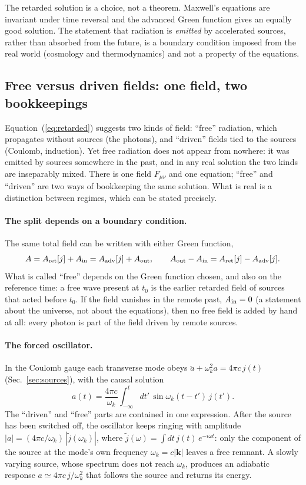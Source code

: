 \documentclass[11pt,a4paper]{book}
\begin{document}
The retarded solution is a choice, not a theorem. Maxwell's equations are invariant under time
reversal and the advanced Green function gives an equally good solution. The statement that
radiation is \emph{emitted} by accelerated sources, rather than absorbed from the future, is a
boundary condition imposed from the real world (cosmology and thermodynamics) and not a property
of the equations.

\subsection{Free versus driven fields: one field, two bookkeepings}
\label{sec:free-vs-driven}

Equation~(\ref{eq:retarded}) suggests two kinds of field: ``free'' radiation, which propagates
without sources (the photons), and ``driven'' fields tied to the sources (Coulomb, induction). Yet
free radiation does not appear from nowhere: it was emitted by sources somewhere in the past,
and in any real solution the two kinds are inseparably mixed. There is one field $F_{\mu\nu}$ and one
equation; ``free'' and ``driven'' are two ways of bookkeeping the same solution. What is real is a
distinction between regimes, which can be stated precisely.

\paragraph{The split depends on a boundary condition.} The same total field can be written with either
Green function,
\begin{equation}
A=A_{\rm ret}[j]+A_{\rm in}=A_{\rm adv}[j]+A_{\rm out},\qquad
A_{\rm out}-A_{\rm in}=A_{\rm ret}[j]-A_{\rm adv}[j].
\end{equation}
What is called ``free'' depends on the Green function chosen, and also on the reference time: a free wave
present at $t_0$ is the earlier retarded field of sources that acted before $t_0$. If the field vanishes in the
remote past, $A_{\rm in}=0$ (a statement about the universe, not about the equations), then no free
field is added by hand at all: every photon is part of the field driven by remote sources.

\paragraph{The forced oscillator.} In the Coulomb gauge each transverse mode obeys
$\ddot a+\omega_k^2a=4\pi c\,j(t)$ (Sec.~\ref{sec:sources}), with the causal solution
\begin{equation}
a(t)=\frac{4\pi c}{\omega_k}\int_{-\infty}^{t}\!dt'\,\sin\omega_k(t-t')\,j(t').
\end{equation}
The ``driven'' and ``free'' parts are contained in one expression. After the source has been switched off,
the oscillator keeps ringing with amplitude $|a|=(4\pi c/\omega_k)\,|\tilde j(\omega_k)|$, where
$\tilde j(\omega)=\int dt\,j(t)\,e^{-i\omega t}$: only the component of the source at the mode's own
frequency $\omega_k=c|\mathbf k|$ leaves a free remnant. A slowly varying source, whose spectrum does not
reach $\omega_k$, produces an adiabatic response $a\simeq4\pi c\,j/\omega_k^2$ that follows the source and returns
its energy.
\end{document}
